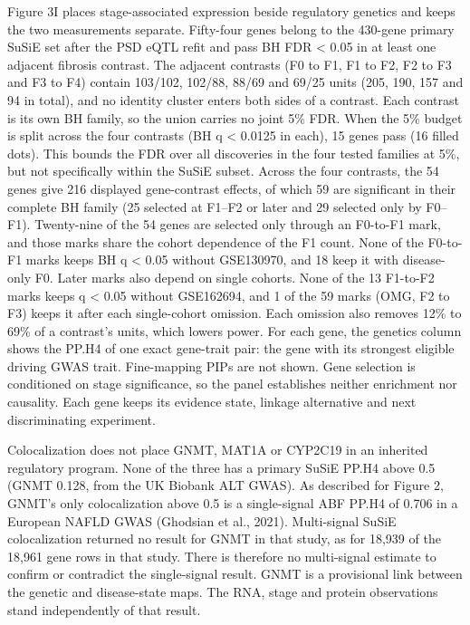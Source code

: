 Figure 3I places stage-associated expression beside regulatory genetics and keeps the two measurements separate. Fifty-four genes belong to the 430-gene primary SuSiE set after the PSD eQTL refit and pass BH FDR \textless{} 0.05 in at least one adjacent fibrosis contrast. The adjacent contrasts (F0 to F1, F1 to F2, F2 to F3 and F3 to F4) contain 103/102, 102/88, 88/69 and 69/25 units (205, 190, 157 and 94 in total), and no identity cluster enters both sides of a contrast. Each contrast is its own BH family, so the union carries no joint 5\% FDR. When the 5\% budget is split across the four contrasts (BH q \textless{} 0.0125 in each), 15 genes pass (16 filled dots). This bounds the FDR over all discoveries in the four tested families at 5\%, but not specifically within the SuSiE subset. Across the four contrasts, the 54 genes give 216 displayed gene-contrast effects, of which 59 are significant in their complete BH family (25 selected at F1--F2 or later and 29 selected only by F0--F1). Twenty-nine of the 54 genes are selected only through an F0-to-F1 mark, and those marks share the cohort dependence of the F1 count. None of the F0-to-F1 marks keeps BH q \textless{} 0.05 without GSE130970, and 18 keep it with disease-only F0. Later marks also depend on single cohorts. None of the 13 F1-to-F2 marks keeps q \textless{} 0.05 without GSE162694, and 1 of the 59 marks (OMG, F2 to F3) keeps it after each single-cohort omission. Each omission also removes 12\% to 69\% of a contrast's units, which lowers power. For each gene, the genetics column shows the PP.H4 of one exact gene-trait pair: the gene with its strongest eligible driving GWAS trait. Fine-mapping PIPs are not shown. Gene selection is conditioned on stage significance, so the panel establishes neither enrichment nor causality. Each gene keeps its evidence state, linkage alternative and next discriminating experiment.

Colocalization does not place GNMT, MAT1A or CYP2C19 in an inherited regulatory program. None of the three has a primary SuSiE PP.H4 above 0.5 (GNMT 0.128, from the UK Biobank ALT GWAS). As described for Figure 2, GNMT's only colocalization above 0.5 is a single-signal ABF PP.H4 of 0.706 in a European NAFLD GWAS (Ghodsian et al., 2021). Multi-signal SuSiE colocalization returned no result for GNMT in that study, as for 18,939 of the 18,961 gene rows in that study. There is therefore no multi-signal estimate to confirm or contradict the single-signal result. GNMT is a provisional link between the genetic and disease-state maps. The RNA, stage and protein observations stand independently of that result.

